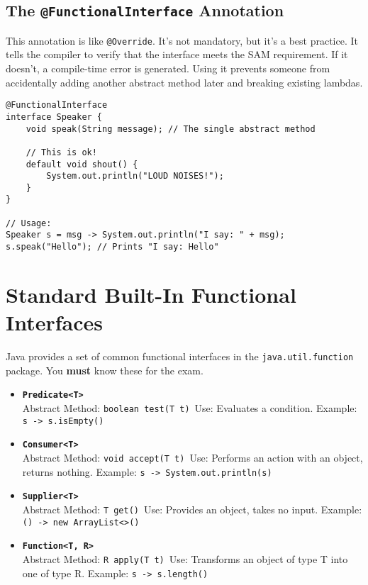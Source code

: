 \documentclass[12pt]{article}
\begin{document}
\begin{enumerate}[label=(\arabic*)]
\subsection{The \texttt{@FunctionalInterface} Annotation}
This annotation is like \texttt{@Override}. It's not mandatory, but it's a best practice. It tells the compiler to verify that the interface meets the SAM requirement. If it doesn't, a compile-time error is generated. Using it prevents someone from accidentally adding another abstract method later and breaking existing lambdas.
\begin{verbatim}
@FunctionalInterface
interface Speaker {
    void speak(String message); // The single abstract method

    // This is ok!
    default void shout() {
        System.out.println("LOUD NOISES!");
    }
}

// Usage:
Speaker s = msg -> System.out.println("I say: " + msg);
s.speak("Hello"); // Prints "I say: Hello"
\end{verbatim}

\section{Standard Built-In Functional Interfaces}
Java provides a set of common functional interfaces in the \texttt{java.util.function} package. You \textbf{must} know these for the exam.
\begin{itemize}
    \item \texttt{\textbf{Predicate<T>}} \\
    Abstract Method: \texttt{boolean test(T t)}\
    Use: Evaluates a condition. Example: \texttt{s -> s.isEmpty()}

    \item \texttt{\textbf{Consumer<T>}} \\
    Abstract Method: \texttt{void accept(T t)}\
    Use: Performs an action with an object, returns nothing. Example: \texttt{s -> System.out.println(s)}

    \item \texttt{\textbf{Supplier<T>}} \\
    Abstract Method: \texttt{T get()}\
    Use: Provides an object, takes no input. Example: \texttt{() -> new ArrayList<>()}

    \item \texttt{\textbf{Function<T, R>}} \\
    Abstract Method: \texttt{R apply(T t)}\
    Use: Transforms an object of type T into one of type R. Example: \texttt{s -> s.length()}


\end{itemize}
\end{enumerate}
\end{document}
